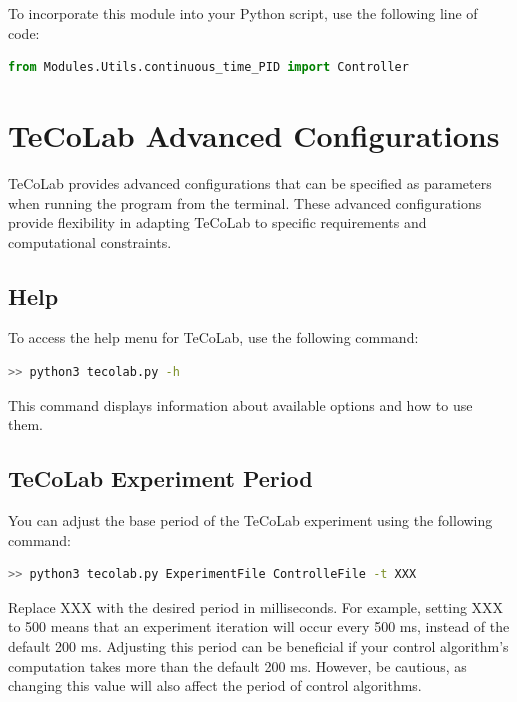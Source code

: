 \documentclass[12pt]{report}
\begin{document}
To incorporate this module into your Python script, use the following line of code:

\begin{lstlisting}[language = Python]
from Modules.Utils.continuous_time_PID import Controller
\end{lstlisting}

\chapter{TeCoLab Advanced Configurations}\label{chap:AdvancedConfigs}

TeCoLab provides advanced configurations that can be specified as parameters when running the program from the terminal. These advanced configurations provide flexibility in adapting TeCoLab to specific requirements and computational constraints.

\section{Help}

To access the help menu for TeCoLab, use the following command:

\begin{lstlisting}[language = bash]
>> python3 tecolab.py -h
\end{lstlisting}

This command displays information about available options and how to use them.

\section{TeCoLab Experiment Period}\label{sec:TeCoLabPeriod}

You can adjust the base period of the TeCoLab experiment using the following command:

\begin{lstlisting}[language = bash]
>> python3 tecolab.py ExperimentFile ControlleFile -t XXX
\end{lstlisting}

Replace XXX with the desired period in milliseconds. For example, setting XXX to 500 means that an experiment iteration will occur every 500 ms, instead of the default 200 ms. Adjusting this period can be beneficial if your control algorithm's computation takes more than the default 200 ms. However, be cautious, as changing this value will also affect the period of control algorithms.
\end{document}
